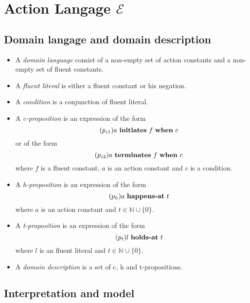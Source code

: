 \section{Action Langage $\mathcal{E}$}\label{sec:e}

\theoremstyle{definition}
\newtheorem{definition}{Definition}[section]

\subsection{Domain langage and domain description}

\begin{itemize}
  \item A \emph{domain language} consist of a non-empty set of action constants and a non-empty set of fluent constants.
  \item A \emph{fluent literal} is either a fluent constant or his negation.
  \item A \emph{condition} is a conjunction of fluent literal.
  \item A \emph{c-proposition} is an expression of the form
    \begin{equation}\label{c1}\tag{$p_{c1}$}
    	a \text{ \textbf{initiates} } f \text{ \textbf{when} } c
    \end{equation}
    or of the form
    \begin{equation}\label{c2}\tag{$p_{c2}$}
    	a \text{ \textbf{terminates} } f \text{ \textbf{when} } c
    \end{equation}
    where $f$ is a fluent constant, $a$ is an action constant and $c$ is a condition.
  \item A \emph{h-proposition} is an expression of the form
    \begin{equation}\label{h}\tag{$p_h$}
      a \text{ \textbf{happens-at} } t
    \end{equation}
    where $a$ is an action constant and $t \in \mathbb{N} \cup \{0\}$.
  \item A \emph{t-proposition} is an expression of the form
    \begin{equation}\label{t}\tag{$p_t$}
      l \text{ \textbf{holds-at} } t
    \end{equation}
    where $l$ is an fluent literal and $t \in \mathbb{N} \cup \{0\}$.
  \item A \emph{domain description} is a set of c, h and t-propositions.
\end{itemize}

\subsection{Interpretation and model}

